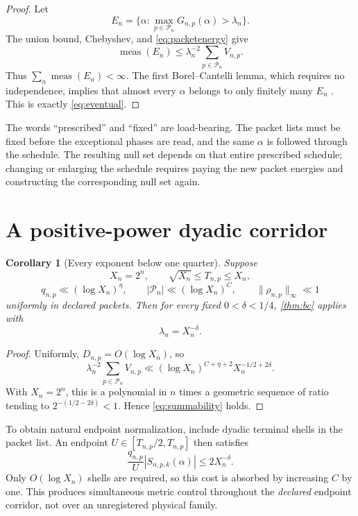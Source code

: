 \documentclass[11pt]{article}
\newtheorem{corollary}[theorem]{Corollary}
\theoremstyle{definition}
\newcommand{\norm}[1]{\lVert#1\rVert}
\begin{document}
\begin{proof}
Let
\[
 E_n=\{\alpha:\max_{p\in\mathcal P_n}G_{n,p}(\alpha)>\lambda_n\}.
\]
The union bound, Chebyshev, and \eqref{eq:packetenergy} give
\[
 \operatorname{meas}(E_n)
 \le\lambda_n^{-2}\sum_{p\in\mathcal P_n}V_{n,p}.
\]
Thus \(\sum_n\operatorname{meas}(E_n)<\infty\).
The first Borel--Cantelli lemma, which requires no independence,
implies that almost every \(\alpha\) belongs to only finitely many
\(E_n\) \citep{Durrett2019}.  This is exactly
\eqref{eq:eventual}.
\end{proof}

The words ``prescribed'' and ``fixed'' are load-bearing.  The packet
lists must be fixed before the exceptional phases are read, and the
same \(\alpha\) is followed through the schedule.  The resulting
null set depends on that entire prescribed schedule; changing or
enlarging the schedule requires paying the new packet energies and
constructing the corresponding null set again.

\section{A positive-power dyadic corridor}

\begin{corollary}[Every exponent below one quarter]\label{cor:power}
Suppose
\[
 X_n=2^n,\qquad
 \sqrt{X_n}\le T_{n,p}\le X_n,
\]
\[
 q_{n,p}\ll(\log X_n)^\eta,\qquad
 |\mathcal P_n|\ll(\log X_n)^C,\qquad
 \norm{\rho_{n,p}}_\infty\ll1
\]
uniformly in declared packets.  Then for every fixed
\(0<\delta<1/4\), \cref{thm:bc} applies with
\[
 \lambda_n=X_n^{-\delta}.
\]
\end{corollary}

\begin{proof}
Uniformly, \(D_{n,p}=O(\log X_n)\), so
\[
 \lambda_n^{-2}\sum_{p\in\mathcal P_n}V_{n,p}
 \ll
 (\log X_n)^{C+\eta+2}
 X_n^{-1/2+2\delta}.
\]
With \(X_n=2^n\), this is a polynomial in \(n\) times a geometric
sequence of ratio tending to
\(2^{-(1/2-2\delta)}<1\).  Hence \eqref{eq:summability} holds.
\end{proof}

To obtain natural endpoint normalization, include dyadic terminal
shells in the packet list.  An endpoint
\(U\in[T_{n,p}/2,T_{n,p}]\) then satisfies
\[
 \frac{q_{n,p}}U|S_{n,p,k}(\alpha)|
 \le2X_n^{-\delta}.
\]
Only \(O(\log X_n)\) shells are required, so this cost is absorbed by
increasing \(C\) by one.  This produces simultaneous metric control
throughout the \emph{declared} endpoint corridor, not over an
unregistered physical family.
\end{document}
